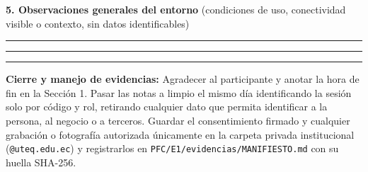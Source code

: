 \documentclass[11pt,a4paper]{article}
\begin{document}
\vspace{8pt}
\textbf{5. Observaciones generales del entorno} {\small (condiciones de uso, conectividad visible o contexto, sin datos identificables)}

\vspace{6pt}
\noindent\rule{\textwidth}{0.4pt}\par\vspace{10pt}
\noindent\rule{\textwidth}{0.4pt}\par\vspace{10pt}
\noindent\rule{\textwidth}{0.4pt}\par

\vspace{8pt}
{\small\textbf{Cierre y manejo de evidencias:} Agradecer al participante y anotar la hora de fin en la Secci\'on 1. Pasar las notas a limpio el mismo d\'ia identificando la sesi\'on solo por c\'odigo y rol, retirando cualquier dato que permita identificar a la persona, al negocio o a terceros. Guardar el consentimiento firmado y cualquier grabaci\'on o fotograf\'ia autorizada \'unicamente en la carpeta privada institucional (\texttt{@uteq.edu.ec}) y registrarlos en \texttt{PFC/E1/evidencias/MANIFIESTO.md} con su huella SHA-256.\par}
\end{document}
